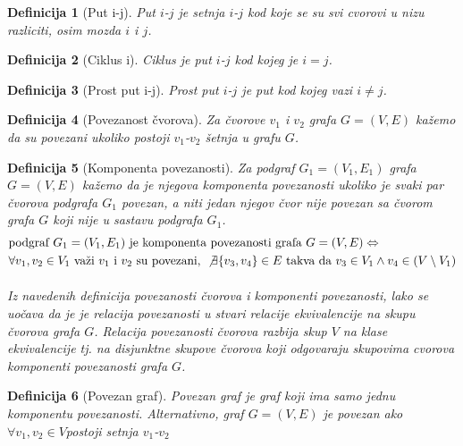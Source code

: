\documentclass[11pt]{article}
\newtheorem{definition}{Definicija}
\begin{document}
		\begin{definition}[Put i-j]
		Put $i$-$j$ je setnja $i$-$j$ kod koje se su svi cvorovi u nizu razliciti, osim mozda $i$ i $j$.
		\end{definition}
		
		\begin{definition}[Ciklus i]
		Ciklus je put $i$-$j$ kod kojeg je $i=j$.
		\end{definition}
		
		\begin{definition}[Prost put i-j]
		Prost put $i$-$j$ je put kod kojeg vazi $i \neq j$.
		\end{definition}
	
		\begin{definition}[Povezanost čvorova]
		Za čvorove $v_1$ i $v_2$ grafa $G = (V, E)$ kažemo da su povezani ukoliko postoji $v_1$-$v_2$ šetnja u grafu $G$. 
		\end{definition}
	
		\begin{definition}[Komponenta povezanosti]
		Za podgraf $G_1 = (V_1, E_1)$ grafa $G = (V, E)$ kažemo da je njegova komponenta povezanosti ukoliko je svaki par čvorova podgrafa $G_1$ povezan, a niti jedan njegov čvor nije povezan sa čvorom grafa $G$ koji nije u sastavu podgrafa $G_1$. 
		\[
			\begin{split}
			&\text{podgraf } G_1 = (V_1, E_1) \text{ je komponenta povezanosti grafa } G = (V, E)  \Leftrightarrow \\
			& \forall v_1,v_2 \in V_1 \text{ važi } v_1 \text{ i } v_2 \text{ su povezani, }  \not \exists \{v_3, v_4\} \in E \text{ takva da } v_3 \in V_1 \land v_4 \in (V \setminus V_1)
			\end{split}
		\]
			\paragraph{}
			Iz navedenih definicija povezanosti čvorova i komponenti povezanosti, lako se uočava da je je relacija povezanosti u stvari relacije ekvivalencije na skupu čvorova grafa $G$. Relacija povezanosti čvorova razbija skup 		$V$ na klase ekvivalencije tj. na disjunktne skupove čvorova koji odgovaraju skupovima cvorova komponenti povezanosti grafa $G$. 
		\end{definition}
	
		\begin{definition}[Povezan graf]
		Povezan graf je graf koji ima samo jednu komponentu povezanosti. 
		Alternativno, graf $G=(V,E)$ je povezan ako $\forall v_1,v_2 \in V$postoji setnja $v_1$-$v_2$
		\end{definition}
	
\end{document}
